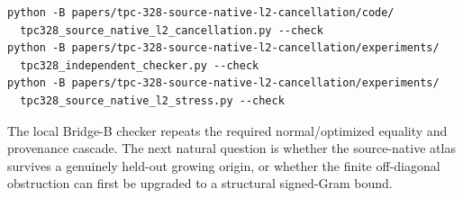 \documentclass[10pt]{article}
\newcommand{\1}{\mathbf 1}
\begin{document}
\begin{verbatim}
python -B papers/tpc-328-source-native-l2-cancellation/code/
  tpc328_source_native_l2_cancellation.py --check
python -B papers/tpc-328-source-native-l2-cancellation/experiments/
  tpc328_independent_checker.py --check
python -B papers/tpc-328-source-native-l2-cancellation/experiments/
  tpc328_source_native_l2_stress.py --check
\end{verbatim}

The local Bridge-B checker repeats the required normal/optimized equality and
provenance cascade.  The next natural question is whether the source-native
atlas survives a genuinely held-out growing origin, or whether the finite
off-diagonal obstruction can first be upgraded to a structural signed-Gram
bound.



\end{document}
